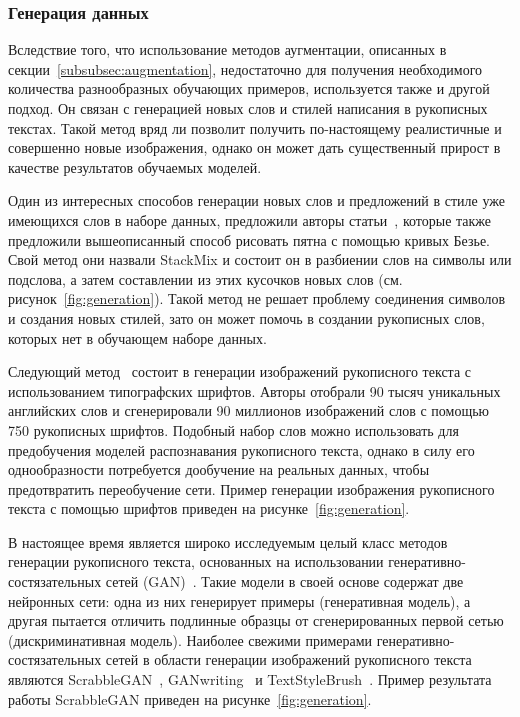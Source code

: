 \subsubsection{Генерация данных}
\label{subsubsec:generation}

Вследствие того, что использование методов аугментации, описанных в секции~\ref{subsubsec:augmentation}, недостаточно для
получения необходимого количества разнообразных обучающих примеров, используется также и другой подход.
Он связан с генерацией новых слов и стилей написания в рукописных текстах.
Такой метод вряд ли позволит получить по-настоящему реалистичные и совершенно новые изображения, однако он может дать
существенный прирост в качестве результатов обучаемых моделей.

Один из интересных способов генерации новых слов и предложений в стиле уже имеющихся слов в наборе данных,
предложили авторы статьи~\cite{shonenkov2021stackmix}, которые также предложили вышеописанный способ рисовать пятна с помощью кривых Безье.
Свой метод они назвали StackMix и состоит он в разбиении слов на символы или подслова, а затем составлении из этих кусочков новых слов (см. рисунок~\ref{fig:generation}).
Такой метод не решает проблему соединения символов и создания новых стилей, зато он может помочь в создании рукописных слов,
которых нет в обучающем наборе данных.

Следующий метод~\cite{krishnan2016generating} состоит в генерации изображений рукописного текста с использованием типографских шрифтов.
Авторы отобрали 90 тысяч уникальных английских слов и сгенерировали 90 миллионов изображений слов с помощью 750 рукописных шрифтов.
Подобный набор слов можно использовать для предобучения моделей распознавания рукописного текста,
однако в силу его однообразности потребуется дообучение на реальных данных, чтобы предотвратить переобучение сети.
Пример генерации изображения рукописного текста с помощью шрифтов приведен на рисунке~\ref{fig:generation}.

В настоящее время является широко исследуемым целый класс методов генерации рукописного текста,
основанных на использовании генеративно-состязательных сетей (GAN)~\cite{goodfellow2020generative}.
Такие модели в своей основе содержат две нейронных сети: одна из них генерирует примеры (генеративная модель),
а другая пытается отличить подлинные образцы от сгенерированных первой сетью (дискриминативная модель).
Наиболее свежими примерами генеративно-состязательных сетей в области генерации изображений рукописного текста являются
ScrabbleGAN~\cite{fogel2020scrabblegan}, GANwriting~\cite{kang2020ganwriting} и TextStyleBrush~\cite{krishnan2023textstylebrush}.
Пример результата работы ScrabbleGAN приведен на рисунке~\ref{fig:generation}.

